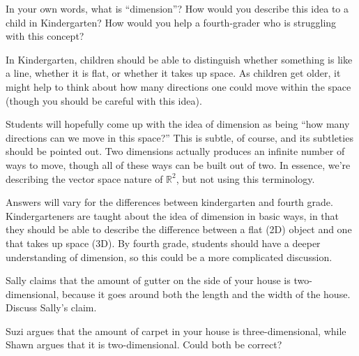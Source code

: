 \documentclass{ximera}
\begin{document}
\begin{problem}
    In your own words, what is ``dimension''?  How would you describe this idea to a child in Kindergarten?  How would you help a fourth-grader who is struggling with this concept?
    
    \begin{solution}
        In Kindergarten, children should be able to distinguish whether something is like a line, whether it is flat, or whether it takes up space.  As children get older, it might help to think about how many directions one could move within the space (though you should be careful with this idea).
    \end{solution}
    
    \begin{instructorNotes}
        Students will hopefully come up with the idea of dimension as being ``how many directions can we move in this space?''  This is subtle, of course, and its subtleties should be pointed out.  Two dimensions actually produces an infinite number of ways to move, though all of these ways can be built out of two.  In essence, we're describing the vector space nature of $\mathbb{R}^2$, but not using this terminology.
        
        Answers will vary for the differences between kindergarten and fourth grade.  Kindergarteners are taught about the idea of dimension in basic ways, in that they should be able to describe the difference between a flat (2D) object and one that takes up space (3D).  By fourth grade, students should have a deeper understanding of dimension, so this could be a more complicated discussion.
    \end{instructorNotes}
\end{problem}

\begin{problem}
    Sally claims that the amount of gutter on the side of your house is two-dimensional, because it goes around both the length and the width of the house.  Discuss Sally's claim.
\end{problem}

\begin{problem}
    Suzi argues that the amount of carpet in your house is three-dimensional, while Shawn argues that it is two-dimensional.  Could both be correct?
\end{problem}
\end{document}
